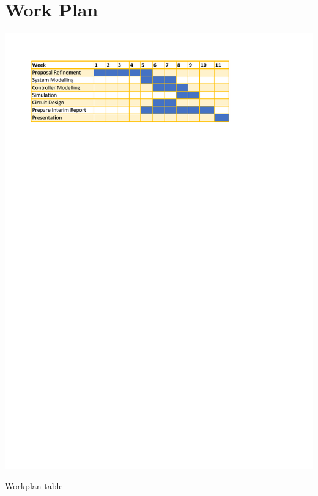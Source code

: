 \section{Work Plan}
\begin{table}[!h]
\includegraphics{Figures/workplan}
\caption{Workplan table}
\end{table}
